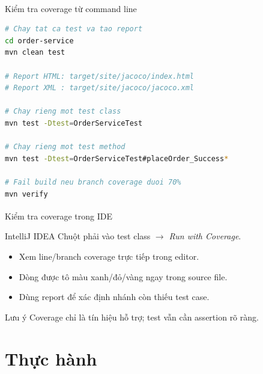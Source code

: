 \documentclass[aspectratio=169,10pt]{beamer}
\newcommand{\sref}[1]{\textsuperscript{\scriptsize\cite{#1}}}
\begin{document}
\begin{frame}[fragile]{Kiểm tra coverage từ command line\sref{jacoco}}
\begin{lstlisting}[language=bash,style=nonumber]
# Chay tat ca test va tao report
cd order-service
mvn clean test

# Report HTML: target/site/jacoco/index.html
# Report XML : target/site/jacoco/jacoco.xml

# Chay rieng mot test class
mvn test -Dtest=OrderServiceTest

# Chay rieng mot test method
mvn test -Dtest=OrderServiceTest#placeOrder_Success*

# Fail build neu branch coverage duoi 70%
mvn verify
\end{lstlisting}
\end{frame}

\begin{frame}{Kiểm tra coverage trong IDE\sref{jacoco}}
  \begin{block}{IntelliJ IDEA}
    Chuột phải vào test class $\to$ \textit{Run with Coverage}.
  \end{block}

  \begin{itemize}
    \item Xem line/branch coverage trực tiếp trong editor.
    \item Dòng được tô màu xanh/đỏ/vàng ngay trong source file.
    \item Dùng report để xác định nhánh còn thiếu test case.
  \end{itemize}

  \begin{alertblock}{Lưu ý}
    Coverage chỉ là tín hiệu hỗ trợ; test vẫn cần assertion rõ ràng.
  \end{alertblock}
\end{frame}

\section{Thực hành}
\end{document}

